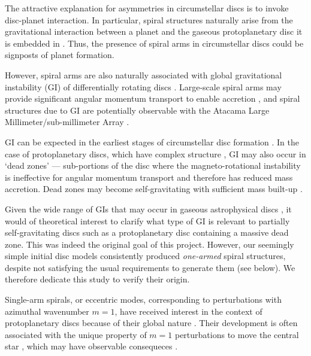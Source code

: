 \documentclass[useAMS,usenatbib]{mn2e}
\begin{document}
The attractive explanation for asymmetries in circumstellar discs is to
invoke disc-planet interaction. In particular, spiral structures
naturally arise from the gravitational interaction between a
planet and the gaseous protoplanetary disc it is embedded in
\citep[see, e.g.][for a recent review]{baruteau13b}. Thus, the
presence of spiral arms in circumstellar discs could be signposts of 
planet formation.  

However, spiral arms are also naturally associated with global gravitational 
instability (GI) of differentially rotating discs
\citep{goldreich65,laughlin96b,laughlin98,nelson98,lodato05,forgan11}. Large-scale
spiral arms may provide significant angular momentum transport to enable
accretion \citep{lynden-bell72, papaloizou91,balbus99,lodato04}, and
spiral structures due to GI are potentially observable with the Atacama Large 
Millimeter/sub-millimeter Array \citep{cossins10,dipierror14}.   

GI can be expected in the earliest stages of 
circumstellar disc formation \citep{kratter10b,inutsuka10,tsukamoto13}. %
In the case of protoplanetary discs, which have complex structure
\citep{armitage10}, GI may also occur in `dead
zones' --- sub-portions of the disc where the magneto-rotational
instability is ineffective for angular momentum transport
\citep{gammie96,turner08,landry13} and therefore has reduced mass
accretion. Dead zones may become
self-gravitating with sufficient mass built-up
\citep{armitage01,martin12,martin12b,zhu09,zhu10,zhu10b,bae13,bae14}.   

Given the wide range of GIs that may occur in  gaseous 
astrophysical discs \citep{papaloizou89,christo92,christo93,hadley11,hadley14}, it would of
theoretical interest to clarify what type of GI is relevant to 
partially self-gravitating discs such as a protoplanetary disc containing a 
massive dead zone. This was indeed the original goal of this project. 
However, our seemingly simple initial disc models
consistently produced \emph{one-armed} spiral structures, despite not 
satisfying the usual requirements to generate them 
(see below). We therefore dedicate this study to verify their origin.     

Single-arm spirals, or eccentric modes, corresponding to perturbations 
with azimuthal wavenumber $m=1$, have received interest in
the context of protoplanetary discs because of their global nature
\citep{adams89,heemskerk92,laughlin96,tremaine01,papaloizou02,hopkins10}. Their development is 
often associated with the unique property of $m=1$ perturbations to
move the central star \citep{shu90}, which may have observable
consequeces \citep{michael10}. 
\end{document}
